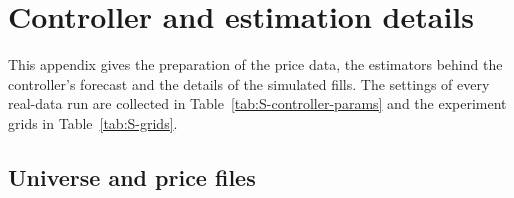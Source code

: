 
\section{Controller and estimation details}\label{app:controller}

This appendix gives the preparation of the price data, the estimators behind the controller's forecast and the
details of the simulated fills. The settings of every real-data run are collected in
Table~\ref{tab:S-controller-params} and the experiment grids in Table~\ref{tab:S-grids}.

\subsection{Universe and price files}


